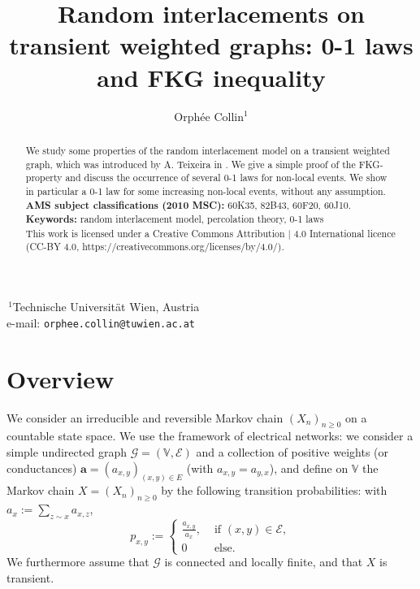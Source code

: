 \documentclass[12pt,a4paper]{article}
\title{Random interlacements on transient weighted graphs: 0-1 laws and FKG inequality}
\author{Orph\'ee Collin$^{1}$}
\newcommand{\1}[1]{{\mathbf 1}{\{#1\}}}
\newcommand{\8}{{\infty}}
\begin{document}
\maketitle

{\footnotesize 
\noindent $^{~1}$Technische Universit\"at Wien, Austria
\\
\noindent e-mail:
\texttt{orphee.collin@tuwien.ac.at}
}



\begin{abstract}
We study some properties of the random interlacement model on a transient weighted graph, which was introduced by A. Teixeira in \cite{Teixeira2009}. We give a simple proof of the FKG-property and discuss the occurrence of several 0-1 laws for non-local events. We show in particular a 0-1 law for some increasing non-local events, without any assumption.
\\[.3cm]\textbf{AMS subject classifications (2010 MSC):}
60K35, %
82B43, %
60F20, %
60J10. %
\\[.3cm]\textbf{Keywords:} random interlacement model, percolation theory, 0-1 laws
\\[.3cm] This work is licensed under a Creative Commons Attribution | 4.0 International licence (CC-BY 4.0, https://creativecommons.org/licenses/by/4.0/).
\end{abstract}

 

\tableofcontents



\section{Overview}


We consider an irreducible and reversible Markov chain $(X_n)_{n\ge 0}$ on a countable state space. We use the framework of electrical networks: we consider a simple undirected graph $\mathcal{G}=(\mathbb{V}, \mathcal{E})$ and a collection of positive weights (or conductances) $\mathbf{a}=(a_{x,y})_{(x,y)\in E}$ (with $a_{x, y}=a_{y,x}$), and define on $\mathbb{V}$ the Markov chain $X=(X_n)_{n\ge 0}$ by the following transition probabilities: with $a_x:=\sum_{z\sim x} a_{x,z}$,
\begin{equation}
  p_{x,y}:=
  \begin{cases}
  \frac{a_{x,y}}{a_x}, & \text{ if } (x,y)\in \mathcal{E}, \\
  0 &  \text{ else}.
  \end{cases}
\end{equation}
We furthermore assume that $\mathcal{G}$ is connected and locally finite, and that $X$ is transient.
\end{document}
